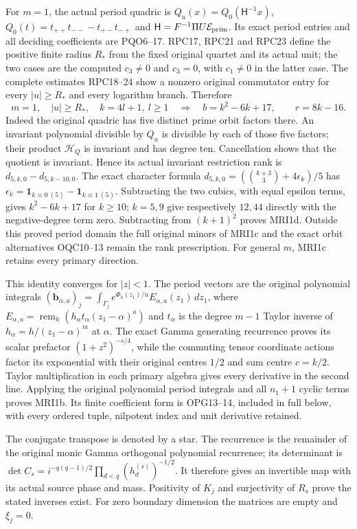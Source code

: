 \documentclass[11pt,a4paper]{article}
\begin{document}
For $m=1$, the actual period quadric is
$Q_u(x)=Q_0(\mathsf H^{-1}x)$,
$Q_0(t)=t_{++}t_{--}-t_{+-}t_{-+}$ and
$\mathsf H=F^{-1}\Pi U\mathcal E_{\rm prim}$.
Its exact period entries and all deciding coefficients are
PQO6--17. RPC17, RPC21 and RPC23 define the positive finite
radius $R_*$ from the fixed original quartet and its actual unit;
the two cases are the computed $c_3\ne0$ and $c_3=0$,
with $c_1\ne0$ in the latter case. The complete estimates
RPC18--24 show a nonzero original commutator entry for every
$|u|\ge R_*$ and every logarithm branch. Therefore
\[
 m=1,\quad |u|\ge R_*,\quad k=4l+1,\ l\ge1
 \quad\Longrightarrow\quad
 b=k^2-6k+17,\qquad r=8k-16.\tag{MRI1d}
\]
Indeed the original quadric has five distinct prime orbit
factors there. An invariant polynomial divisible by $Q_u$
is divisible by each of those five factors; their product
$\mathcal H_Q$ is invariant and has degree ten. Cancellation
shows that the quotient is invariant. Hence its actual
invariant restriction rank is $d_{5,k,0}-d_{5,k-10,0}$.
The exact character formula
$d_{5,k,0}=(\binom{k+3}{3}+4\epsilon_k)/5$ has
$\epsilon_k=\mathbf1_{k\equiv0\ (5)}-\mathbf1_{k\equiv1\ (5)}$.
Subtracting the two cubics, with equal epsilon terms, gives
$k^2-6k+17$ for $k\ge10$; $k=5,9$ give respectively
$12,44$ directly with the negative-degree term zero.
Subtracting from $(k+1)^2$ proves MRI1d. Outside this proved
period domain the full original minors of MRI1c and the exact
orbit alternatives OQC10--13 remain the rank prescription.
For general $m$, MRI1c retains every primary direction.

This identity converges for $|z|<1$. The period vectors are the
original polynomial integrals
$(\mathbf b_{\alpha,a})_j=\int_{\Gamma_j}
e^{\Phi_h(z_1)/u}E_{\alpha,a}(z_1)\,dz_1$, where
$E_{\alpha,a}=\operatorname{rem}_h(h_\alpha t_\alpha
(z_1-\alpha)^a)$ and $t_\alpha$ is the degree $m-1$ Taylor
inverse of $h_\alpha=h/(z_1-\alpha)^m$ at $\alpha$.
The exact Gamma generating recurrence proves its scalar
prefactor $(1+z^2)^{-s/4}$, while the commuting tensor coordinate
actions factor its exponential with their original centres
$1/2$ and sum centre $c=k/2$. Taylor multiplication in each
primary algebra gives every derivative in the second line.
Applying the original polynomial period integrals and all
$n_1+1$ cyclic terms proves MRI1b. Its finite coefficient form
is OPG13--14, included in full below, with every ordered tuple,
nilpotent index and unit derivative retained.

The conjugate transpose is denoted by a star. The recurrence is
the remainder of the original monic Gamma orthogonal polynomial
recurrence; its determinant is
$\det C_s=i^{-q(q-1)/2}\prod_{d<q}(h_d^{(s)})^{-1/2}$.
It therefore gives an invertible map with its actual source
phase and mass. Positivity of $K_j$ and surjectivity of $R_s$
prove the stated inverses exist. For zero boundary dimension
the matrices are empty and $\xi_j=0$.
\end{document}
